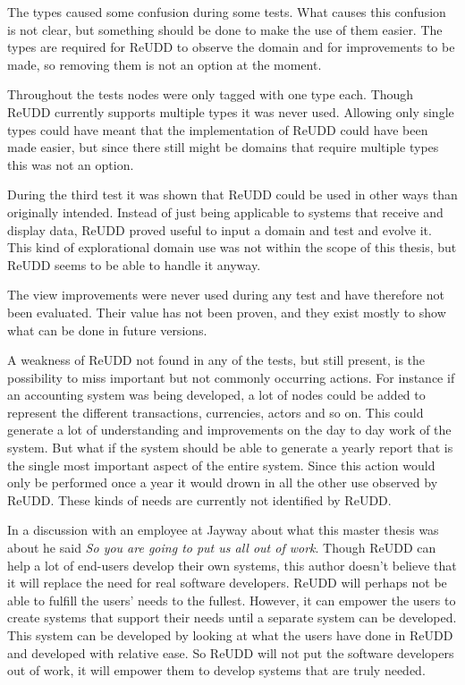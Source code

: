 \documentclass[a4paper]{report}
\begin{document}
The types caused some confusion during some tests. What causes this confusion is not clear, but something should be done to make the use of them easier. The types are required for ReUDD to observe the domain and for improvements to be made, so removing them is not an option at the moment.

Throughout the tests nodes were only tagged with one type each. Though ReUDD currently supports multiple types it was never used. Allowing only single types could have meant that the implementation of ReUDD could have been made easier, but since there still might be domains that require multiple types this was not an option.

During the third test it was shown that ReUDD could be used in other ways than originally intended. Instead of just being applicable to systems that receive and display data, ReUDD proved useful to input a domain and test and evolve it. This kind of explorational domain use was not within the scope of this thesis, but ReUDD seems to be able to handle it anyway.

The view improvements were never used during any test and have therefore not been evaluated. Their value has not been proven, and they exist mostly to show what can be done in future versions.

A weakness of ReUDD not found in any of the tests, but still present, is the possibility to miss important but not commonly occurring actions. For instance if an accounting system was being developed, a lot of nodes could be added to represent the different transactions, currencies, actors and so on. This could generate a lot of understanding and improvements on the day to day work of the system. But what if the system should be able to generate a yearly report that is the single most important aspect of the entire system. Since this action would only be performed once a year it would drown in all the other use observed by ReUDD. These kinds of needs are currently not identified by ReUDD.

In a discussion with an employee at Jayway about what this master thesis was about he said \emph{So you are going to put us all out of work}. Though ReUDD can help a lot of end-users develop their own systems, this author doesn't believe that it will replace the need for real software developers. ReUDD will perhaps not be able to fulfill the users' needs to the fullest. However, it can empower the users to create systems that support their needs until a separate system can be developed. This system can be developed by looking at what the users have done in ReUDD and developed with relative ease. So ReUDD will not put the software developers out of work, it will empower them to develop systems that are truly needed.
\end{document}
